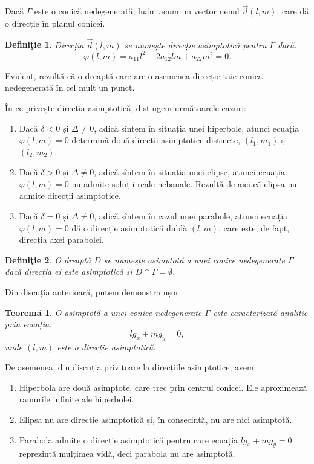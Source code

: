 \documentclass[11pt,a4paper]{article}
\theoremstyle{dotless}
\newtheorem{theorem}{Teorem\u{a}}[section]
\theoremstyle{dotlessdr}
\newtheorem{definition}{Defini\c{t}ie}[section]
\begin{document}
Dacă $\Gamma$ este o conică nedegenerată, luăm acum un vector nenul
$\vec{d}(l, m)$, care dă o direcție în planul conicei.

\begin{definition}

	Direcția $\vec{d}(l, m)$ se numește \emph{direcție asimptotică} pentru
$\Gamma$ dacă: 
 \[
	\varphi(l, m) = a_{11} l^2 + 2a_{12} lm + a_{22}m^2 = 0.
\]
\end{definition}

Evident, rezultă că o dreaptă care are o asemenea direcție taie conica
nedegenerată în cel mult un punct.

În ce privește direcția asimptotică, distingem următoarele cazuri:

\begin{enumerate}[(1)]
	\item Dacă $\delta < 0$ și $\Delta \neq 0$, adică sîntem în situația unei
hiperbole, atunci ecuația $\varphi(l, m) = 0$ determină două direcții 
asimptotice distincte, $(l_1, m_1)$ și $(l_2, m_2)$.
    \item Dacă $\delta > 0$ și $\Delta \neq 0$, adică sîntem în situația unei
elipse, atunci ecuația $\varphi(l, m) = 0$ nu admite soluții reale nebanale.
Rezultă de aici că elipsa nu admite direcții asimptotice.
    \item Dacă $\delta = 0$ și $\Delta \neq 0$, adică sîntem în cazul unei
parabole, atunci ecuația $\varphi(l, m) = 0$ dă o direcție asimptotică dublă
$(l, m)$, care este, de fapt, direcția axei parabolei.
\end{enumerate}

\begin{definition}
	O dreaptă $D$ se numește \emph{asimptotă} a unei conice nedegenerate 
$\Gamma$ dacă direcția ei este asimptotică și $D \cap \Gamma = \emptyset$.
\end{definition}

Din discuția anterioară, putem demonstra ușor:

\begin{theorem}
	O asimptotă a unei conice nedegenerate $\Gamma$ este caracterizată analitic
prin ecuația: 
 \[
	l g_x + m g_y = 0,
\]
unde $(l, m)$ este o direcție asimptotică.
\end{theorem}

De asemenea, din discuția privitoare la direcțiile asimptotice, avem:
\begin{enumerate}[(1)]
	\item Hiperbola are două asimptote, care trec prin centrul conicei.
Ele aproximează ramurile infinite ale hiperbolei.
    \item Elipsa nu are direcție asimptotică și, în consecință, nu are nici
asimptotă.
    \item Parabola admite o direcție asimptotică pentru care ecuația
$l g_x + m g_y = 0$ reprezintă mulțimea vidă, deci parabola nu are asimptotă.
\end{enumerate}
\end{document}
